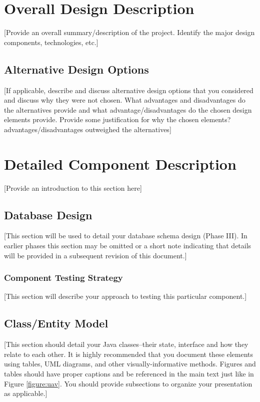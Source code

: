 \documentclass[12pt]{scrartcl} %
\begin{document}
\section{Overall Design Description}
  
[Provide an overall summary/description of the project.  Identify the major design components, technologies, etc.]
  
\subsection{Alternative Design Options}

[If applicable, describe and discuss alternative design options that you considered and discuss why they were not chosen.  What advantages and disadvantages do the alternatives provide and what advantage/disadvantages do the chosen design elements provide.  Provide some justification for why the chosen elements? advantages/disadvantages outweighed the alternatives]

\section{Detailed Component Description}

[Provide an introduction to this section here]

\subsection{Database Design}

[This section will be used to detail your database schema design (Phase III).  In earlier phases this section may be omitted or a short note indicating that details will be provided in a subsequent revision of this document.]

\subsubsection{Component Testing Strategy}

[This section will describe your approach to testing this particular component.]

\subsection{Class/Entity Model}

[This section should detail your Java classes--their state, interface and how they relate to each other.  It is highly recommended that you document these elements using tables, UML diagrams, and other visually-informative methods.  Figures and tables should have proper captions and be referenced in the main text just like in Figure \ref{figure:uav}.  You should provide subsections to organize your presentation as applicable.]
\end{document}
